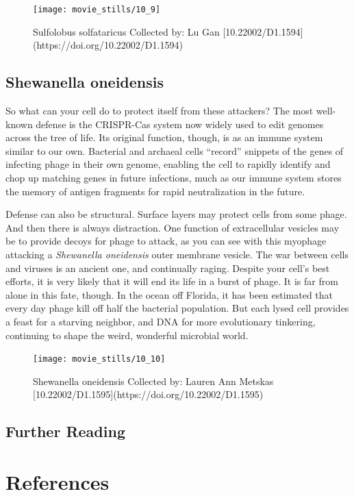 \documentclass[]{tufte-book}
\begin{document}
\begin{figure}
\texttt{[image: movie\_stills/10\_9]} \caption[Sulfolobus solfataricus Collected by]{Sulfolobus solfataricus Collected by: Lu Gan [10.22002/D1.1594](https://doi.org/10.22002/D1.1594)}\label{fig:unnamed-chunk-181}
\end{figure}

\section{Shewanella oneidensis}\label{shewanella-oneidensis-2}

So what can your cell do to protect itself from these attackers? The
most well-known defense is the CRISPR-Cas system now widely used to edit
genomes across the tree of life. Its original function, though, is as an
immune system similar to our own. Bacterial and archaeal cells
``record'' snippets of the genes of infecting phage in their own genome,
enabling the cell to rapidly identify and chop up matching genes in
future infections, much as our immune system stores the memory of
antigen fragments for rapid neutralization in the future.

Defense can also be structural. Surface layers may protect cells from
some phage. And then there is always distraction. One function of
extracellular vesicles may be to provide decoys for phage to attack, as
you can see with this myophage attacking a \emph{Shewanella oneidensis}
outer membrane vesicle. The war between cells and viruses is an ancient
one, and continually raging. Despite your cell's best efforts, it is
very likely that it will end its life in a burst of phage. It is far
from alone in this fate, though. In the ocean off Florida, it has been
estimated that every day phage kill off half the bacterial population.
But each lysed cell provides a feast for a starving neighbor, and DNA
for more evolutionary tinkering, continuing to shape the weird,
wonderful microbial world.

\begin{figure}
\texttt{[image: movie\_stills/10\_10]} \caption[Shewanella oneidensis Collected by]{Shewanella oneidensis Collected by: Lauren Ann Metskas [10.22002/D1.1595](https://doi.org/10.22002/D1.1595)}\label{fig:unnamed-chunk-182}
\end{figure}

\section{Further Reading}\label{further-reading-9}

\citet{keen2015} \citet{prangishvili2017} \citet{rohwer2014}

\chapter{References}\label{references}


\end{document}
